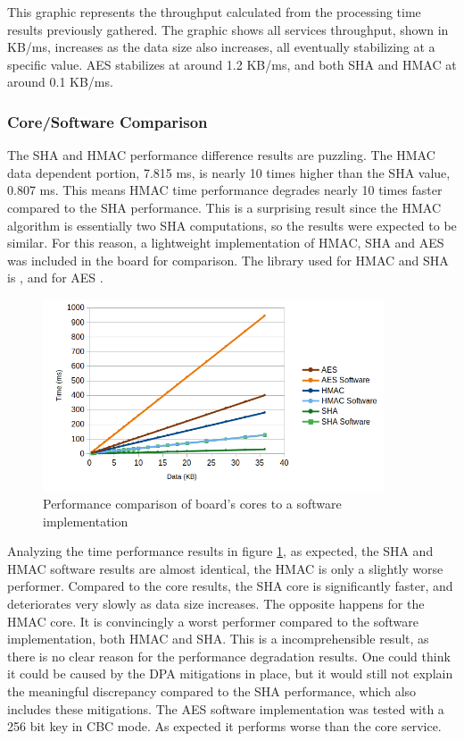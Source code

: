 This graphic represents the throughput calculated from the processing time results previously gathered. The graphic shows all services throughput, shown in KB/ms, increases as the data size also increases, all eventually stabilizing at a specific value. \ac{AES} stabilizes at around 1.2 KB/ms, and both \ac{SHA} and \ac{HMAC} at around 0.1 KB/ms.

\subsubsection{Core/Software Comparison}\label{chap:evaluation:services:software}

The SHA and HMAC performance difference results are puzzling. The HMAC data dependent portion, 7.815 ms, is nearly 10 times higher than the SHA value, 0.807 ms. This means HMAC time performance degrades nearly 10 times faster compared to the SHA performance. This is a surprising result since the HMAC algorithm is essentially two SHA computations, so the results were expected to be similar.
For this reason, a lightweight implementation of HMAC, SHA and AES was included in the board for comparison. The library used for HMAC and SHA is \cite{ogayHMAC}, and for AES \cite{tinycrypt}. 

\begin{figure}[h!]
	\centering
	\includegraphics[width=0.9\textwidth]{./Images/software-core-time.png}
	\caption{Performance comparison of board's cores to a software implementation}
	\label{fig:performance:software-core-time}
\end{figure}

Analyzing the time performance results in figure \ref{fig:performance:software-core-time}, as expected, the SHA and HMAC software results are almost identical, the HMAC is only a slightly worse performer. Compared to the core results, the SHA core is significantly faster, and deteriorates very slowly as data size increases. The opposite happens for the HMAC core. It is convincingly a worst performer compared to the software implementation, both HMAC and SHA. 
This is a incomprehensible result, as there is no clear reason for the performance degradation results. One could think it could be caused by the \ac{DPA} mitigations in place, but it would still not explain the meaningful discrepancy compared to the SHA performance, which also includes these mitigations.
The AES software implementation was tested with a 256 bit key in CBC mode. As expected it performs worse than the core service.

